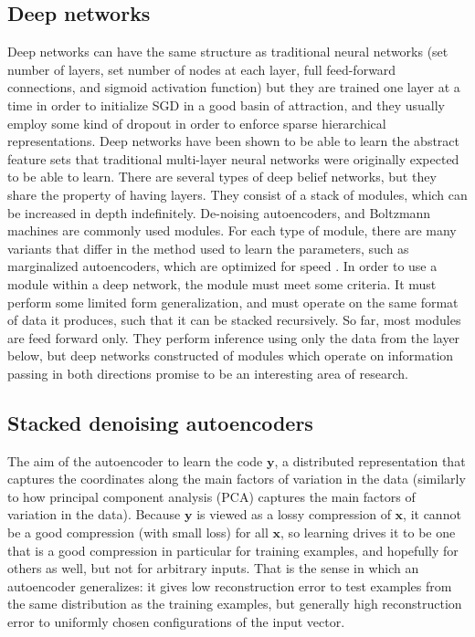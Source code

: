 \documentclass[12pt]{article}
\begin{document}
\begin{doublespacing}
	\subsection{Deep networks}
Deep networks can have the same structure as traditional neural networks (set number of layers, set number of nodes at each layer, full feed-forward connections, and sigmoid activation function) but they are trained one layer at a time in order to initialize SGD in a good basin of attraction, and they usually employ some kind of dropout in order to enforce sparse hierarchical representations\cite{hinton2012improving, krizhevsky2012imagenet}. 
Deep networks have been shown to be able to learn the abstract feature sets that traditional multi-layer neural networks were originally expected to be able to learn. There are several types of deep belief networks, but they share the property of having layers. They consist of a stack of modules, which can be increased in depth indefinitely. De-noising autoencoders, and Boltzmann machines are commonly used modules. 
For each type of module, there are many variants that differ in the method used to learn the parameters, such as marginalized autoencoders, which are optimized for speed \cite{chen2012marginalized}. In order to use a module within a deep network, the module must meet some criteria. It must perform some limited form generalization, and must operate on the same format of data it produces, such that it can be stacked recursively. So far, most modules are feed forward only. They perform inference using only the data from the layer below, but deep networks constructed of modules which operate on information passing in both directions promise to be an interesting area of research.

	\subsection{Stacked denoising autoencoders}
The aim of the autoencoder to learn the code $\mathbf y$, a distributed representation that captures the coordinates along the main factors of variation in the data (similarly to how principal component analysis (PCA) captures the main factors of variation in the data). Because $\mathbf y$ is viewed as a lossy compression of $\mathbf x$, it cannot be a good compression (with small loss) for all $\mathbf x$, so learning drives it to be one that is a good compression in particular for training examples, and hopefully for others as well, but not for arbitrary inputs. That is the sense in which an autoencoder generalizes: it gives low reconstruction error to test examples from the same distribution as the training examples, but generally high reconstruction error to uniformly chosen configurations of the input vector.


\end{doublespacing}
\end{document}
